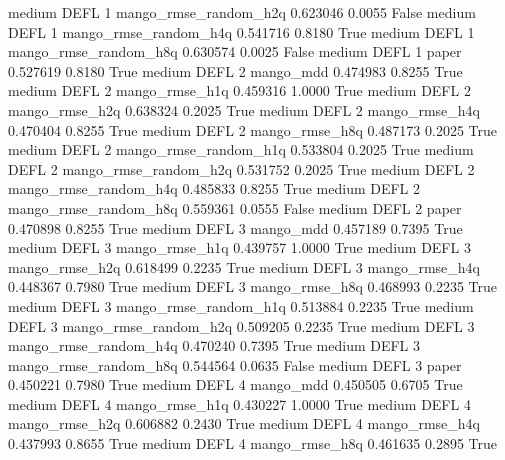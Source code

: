     medium     DEFL                 1 mango_rmse_random_h2q   0.623046      0.0055   False
    medium     DEFL                 1 mango_rmse_random_h4q   0.541716      0.8180    True
    medium     DEFL                 1 mango_rmse_random_h8q   0.630574      0.0025   False
    medium     DEFL                 1                 paper   0.527619      0.8180    True
    medium     DEFL                 2             mango_mdd   0.474983      0.8255    True
    medium     DEFL                 2        mango_rmse_h1q   0.459316      1.0000    True
    medium     DEFL                 2        mango_rmse_h2q   0.638324      0.2025    True
    medium     DEFL                 2        mango_rmse_h4q   0.470404      0.8255    True
    medium     DEFL                 2        mango_rmse_h8q   0.487173      0.2025    True
    medium     DEFL                 2 mango_rmse_random_h1q   0.533804      0.2025    True
    medium     DEFL                 2 mango_rmse_random_h2q   0.531752      0.2025    True
    medium     DEFL                 2 mango_rmse_random_h4q   0.485833      0.8255    True
    medium     DEFL                 2 mango_rmse_random_h8q   0.559361      0.0555   False
    medium     DEFL                 2                 paper   0.470898      0.8255    True
    medium     DEFL                 3             mango_mdd   0.457189      0.7395    True
    medium     DEFL                 3        mango_rmse_h1q   0.439757      1.0000    True
    medium     DEFL                 3        mango_rmse_h2q   0.618499      0.2235    True
    medium     DEFL                 3        mango_rmse_h4q   0.448367      0.7980    True
    medium     DEFL                 3        mango_rmse_h8q   0.468993      0.2235    True
    medium     DEFL                 3 mango_rmse_random_h1q   0.513884      0.2235    True
    medium     DEFL                 3 mango_rmse_random_h2q   0.509205      0.2235    True
    medium     DEFL                 3 mango_rmse_random_h4q   0.470240      0.7395    True
    medium     DEFL                 3 mango_rmse_random_h8q   0.544564      0.0635   False
    medium     DEFL                 3                 paper   0.450221      0.7980    True
    medium     DEFL                 4             mango_mdd   0.450505      0.6705    True
    medium     DEFL                 4        mango_rmse_h1q   0.430227      1.0000    True
    medium     DEFL                 4        mango_rmse_h2q   0.606882      0.2430    True
    medium     DEFL                 4        mango_rmse_h4q   0.437993      0.8655    True
    medium     DEFL                 4        mango_rmse_h8q   0.461635      0.2895    True
